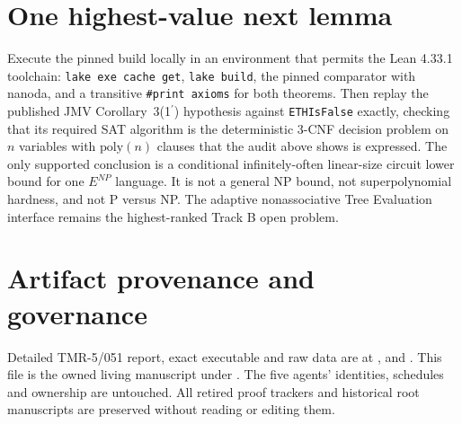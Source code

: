 \documentclass[11pt]{article}
\begin{document}
\section{One highest-value next lemma}
Execute the pinned build locally in an environment that permits the
Lean 4.33.1 toolchain: \texttt{lake exe cache get}, \texttt{lake build},
the pinned comparator with nanoda, and a transitive
\texttt{\#print axioms} for both theorems. Then replay the published
JMV Corollary~3(1\(^\prime\)) hypothesis against \texttt{ETHIsFalse}
exactly, checking that its required SAT algorithm is the deterministic
3-CNF decision problem on \(n\) variables with \(\mathrm{poly}(n)\)
clauses that the audit above shows is expressed. The only supported
conclusion is a conditional infinitely-often linear-size circuit lower
bound for one \(E^{NP}\) language. It is not a general NP bound, not
superpolynomial hardness, and not P versus NP. The adaptive
nonassociative Tree Evaluation interface remains the highest-ranked
Track B open problem.

\section{Artifact provenance and governance}
Detailed TMR-5/051 report, exact executable and raw data are at
,
 and .
This file is the owned living manuscript under
.
The five agents' identities, schedules and ownership are untouched.
All retired proof trackers and historical root manuscripts are
preserved without reading or editing them.
\end{document}
